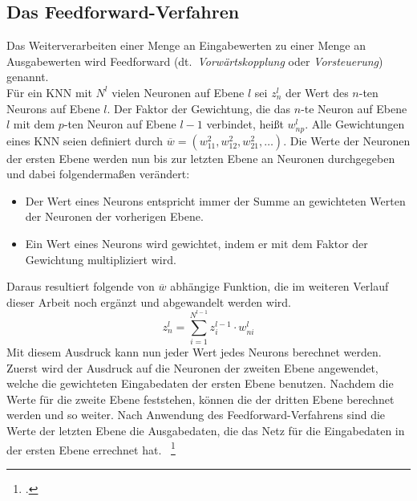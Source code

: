 \subsection{Das Feedforward-Verfahren}\label{subsec:feedforward}
Das Weiterverarbeiten einer Menge an Eingabewerten zu einer Menge an Ausgabewerten wird Feedforward (dt.~\textit{Vorwärtskopplung} oder \textit{Vorsteuerung}) genannt.\\
Für ein KNN mit $N^l$ vielen Neuronen auf Ebene $l$ sei $z^l_n$ der Wert des $n$-ten Neurons auf Ebene $l$.
Der Faktor der Gewichtung, die das $n$-te Neuron auf Ebene $l$ mit dem $p$-ten Neuron auf Ebene $l-1$ verbindet, heißt $w^l_{n p}$.
Alle Gewichtungen eines KNN seien definiert durch $\overline{w} = (w^2_{11}, w^2_{12}, w^2_{21}, \dots)$.
Die Werte der Neuronen der ersten Ebene werden nun bis zur letzten Ebene an Neuronen durchgegeben und dabei folgendermaßen verändert:
\begin{itemize}
    \item Der Wert eines Neurons entspricht immer der Summe an gewichteten Werten der Neuronen der vorherigen Ebene.
    \item Ein Wert eines Neurons wird gewichtet, indem er mit dem Faktor der Gewichtung multipliziert wird.
\end{itemize}
Daraus resultiert folgende von $\overline{w}$ abhängige Funktion, die im weiteren Verlauf dieser Arbeit noch ergänzt und abgewandelt werden wird.
\begin{equation}
    z^l_n = \sum\limits^{N^{l-1}}_{i=1} z^{l-1}_i \cdot w^l_{n i}
    \label{eq:z}
\end{equation}
Mit diesem Ausdruck kann nun jeder Wert jedes Neurons berechnet werden.
Zuerst wird der Ausdruck auf die Neuronen der zweiten Ebene angewendet, welche die gewichteten Eingabedaten der ersten Ebene benutzen.
Nachdem die Werte für die zweite Ebene feststehen, können die der dritten Ebene berechnet werden und so weiter.
Nach Anwendung des Feedforward-Verfahrens sind die Werte der letzten Ebene die Ausgabedaten, die das Netz für die Eingabedaten in der ersten Ebene errechnet hat.
~\footcite{3b1b-1}

